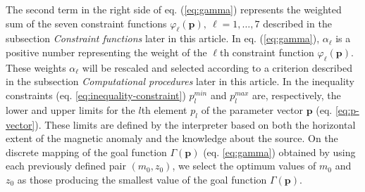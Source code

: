 The second term in the right side of eq. (\ref{eq:gamma}) represents the weighted sum of
the seven constraint functions $\varphi_{\ell}(\mathbf{p}), \: \ell = 1, \dots, 7$ 
described in the subsection \textit{Constraint functions} later in this article.
In eq. (\ref{eq:gamma}), $\alpha_{\ell}$ is a positive number representing 
the weight of the $\ell$th constraint function $\varphi_{\ell}(\mathbf{p})$.
These weights $\alpha_{\ell}$ will be rescaled and selected according to a criterion described in the subsection \textit{Computational procedures} later in this article.
In the inequality constraints (eq. \ref{eq:inequality-constraint}) 
$p_{l}^{min}$ and $p_{l}^{max}$ are, respectively, the lower and upper limits for the $l$th element $p_{l}$ of the parameter vector $\mathbf{p}$ (eq. \ref{eq:p-vector}). 
These limits are defined by the interpreter 
based on both the horizontal extent of the magnetic anomaly and the knowledge about the 
source.
On the discrete mapping of the goal function $\Gamma (\mathbf{p})$ 
(eq. \ref{eq:gamma}) obtained by using each previously defined pair $(m_{0}, z_{0})$, 
we select the optimum values of $m_{0}$ and $z_{0}$ 
as those producing the smallest value of the goal function $\Gamma (\mathbf{p})$.

